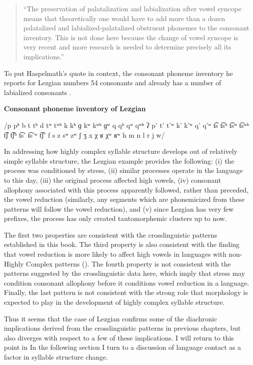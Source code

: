 \begin{quote}
“The preservation of palatalization and labialization after vowel syncope means that theoretically one would have to add more than a dozen palatalized and labialized-palatalized obstruent phonemes to the consonant inventory. This is not done here because the change of vowel syncope is very recent and more research is needed to determine precisely all its implications.”

\citep[38]{Haspelmath1993}
\end{quote}

To put Haspelmath’s quote in context, the consonant phoneme inventory he reports for Lezgian numbers 54 consonants and already has a number of labialized consonants .

\ea\label{ex:(8.4)}
  \textbf{Consonant} \textbf{phoneme} \textbf{inventory} \textbf{of} \textbf{Lezgian}

/p pʰ b t tʰ d tʷ tʷʰ k kʰ ɡ kʷ kʷʰ ɡʷ q qʰ qʷ qʷʰ ʔ p’ t’ t’ʷ k’ k’ʷ q’ q’ʷ t͡s t͡sʰ t͡sʷ t͡sʷʰ t͡ʃ t͡ʃʰ t͡s’ t͡s’ʷ t͡ʃ’ f s z sʷ zʷ ʃ ʒ x χ ʁ χʷ ʁʷ h m n l r j w/

\z

  In addressing how highly complex syllable structure develops out of relatively simple syllable structure, the Lezgian example provides the following: (i) the process was conditioned by stress, (ii) similar processes operate in the language to this day, (iii) the original process affected high vowels, (iv) consonant allophony associated with this process apparently followed, rather than preceded, the vowel reduction (similarly, any segments which are phonemicized from these patterns will follow the vowel reduction), and (v) since Lezgian has very few prefixes, the process has only created tautomorphemic clusters up to now. 

  The first two properties are consistent with the crosslinguistic patterns established in this book. The third property is also consistent with the finding that vowel reduction is more likely to affect high vowels in languages with non-Highly Complex patterns (). The fourth property is not consistent with the patterns suggested by the crosslinguistic data here, which imply that stress may condition consonant allophony before it conditions vowel reduction in a language. Finally, the last pattern is not consistent with the strong role that morphology is expected to play in the development of highly complex syllable structure.

  Thus it seems that the case of Lezgian confirms some of the diachronic implications derived from the crosslinguistic patterns in previous chapters, but also diverges with respect to a few of these implications. I will return to this point in  In the following section I turn to a discussion of language contact as a factor in syllable structure change.

